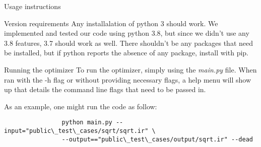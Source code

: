 \documentclass[letterpaper,12pt]{article}
\theoremstyle{definition}
\begin{document}
	\begin{section}{Usage instructions}
		\begin{subsection}{Version requirements}
			Any installalation of python 3 should work. We implemented and tested our code using python 3.8, but since we didn't use any 3.8 features, 3.7 should work as well. There shouldn't be any packages that need be installed, but if python reports the absence of any package, install with pip.
		\end{subsection}

		\begin{subsection}{Running the optimizer}
			To run the optimizer, simply using the \textit{main.py} file. When ran with the -h flag or without providing necessary flags, a help menu will show up that details the command line flags that need to be passed in.

			As an example, one might run the code as follow: \\
			\begin{verbatim}
				python main.py --input="public\_test\_cases/sqrt/sqrt.ir" \
				--output=="public\_test\_cases/output/sqrt.ir" --dead
			\end{verbatim}
		\end{subsection}
	\end{section}
\end{document}
